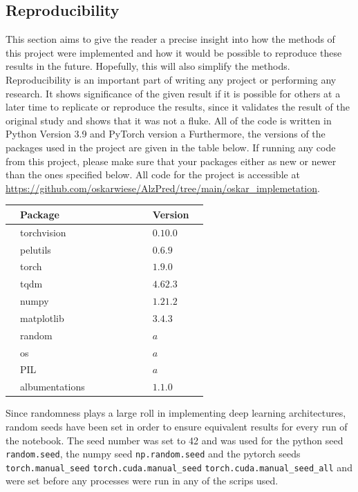 \documentclass[12pt, fleqn, titlepage]{article}
\begin{document}
\subsection{Reproducibility}\label{repro}
This section aims to give the reader a precise insight into how the methods of this project were implemented and how it would be possible to reproduce these results in the future. Hopefully, this will also simplify the methods. Reproducibility is an important part of writing any project or performing any research. It shows significance of the given result if it is possible for others at a later time to replicate or reproduce the results, since it validates the result of the original study and shows that it was not a fluke. All of the code is written in Python Version 3.9 and PyTorch version a%
Furthermore, the versions of the packages used in the project are given in the table below. If running any code from this project, please make sure that your packages either as new or newer than the ones specified below. All code for the project is accessible at \url{https://github.com/oskarwiese/AlzPred/tree/main/oskar_implemetation}.
\begin{table}[H]
	\begin{center}
		\begin{tabular}{l l l l l l l l l l}
			\toprule
			& \textbf{Package}      & & & & & & & \textbf{Version}  & \\ \midrule
			& torchvision   & & & & & & & $0.10.0$ & \\
			& pelutils      & & & & & & & $0.6.9$  & \\
			& torch         & & & & & & & $1.9.0$  & \\
			& tqdm          & & & & & & & $4.62.3$ & \\
			& numpy         & & & & & & & $1.21.2$ & \\
			& matplotlib    & & & & & & & $3.4.3$  & \\
			& random        & & & & & & & $a$      & \\
			& os            & & & & & & & $a$      & \\
			& PIL           & & & & & & & $a$      & \\
			& albumentations& & & & & & & $1.1.0$  & \\ \bottomrule
		\end{tabular}
	\end{center}
\end{table}
\noindent Since randomness plays a large roll in implementing deep learning architectures, random seeds have been set in order to ensure equivalent results for every run of the notebook. The seed number was set to 42 and was used for the python seed \texttt{random.seed}, the numpy seed \texttt{np.random.seed} and the pytorch seeds \texttt{torch.manual\_seed} \texttt{torch.cuda.manual\_seed}
\texttt{torch.cuda.manual\_seed\_all} and were set before any processes were run in any of the scrips used.
\end{document}
